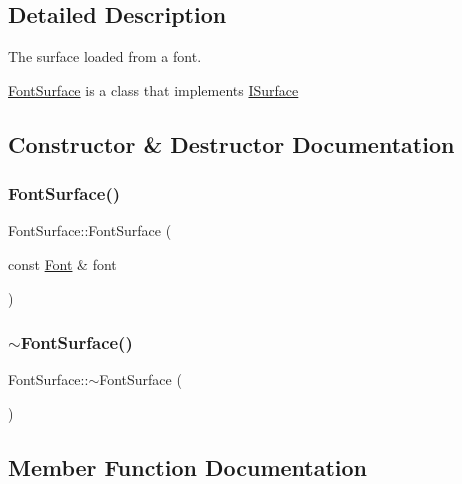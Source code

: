 \subsection{Detailed Description}
The surface loaded from a font. 

\mbox{\hyperlink{class_font_surface}{Font\+Surface}} is a class that implements \mbox{\hyperlink{class_i_surface}{I\+Surface}} 

\subsection{Constructor \& Destructor Documentation}
\mbox{\label{class_font_surface_af8e3c82416727b71fd13f8f49ffbb3ef}} 
\subsubsection{\texorpdfstring{Font\+Surface()}{FontSurface()}}
{\footnotesize\ttfamily Font\+Surface\+::\+Font\+Surface (\begin{DoxyParamCaption}\item[{const \mbox{\hyperlink{class_font}{Font}} \&}]{font }\end{DoxyParamCaption})}

\mbox{\label{class_font_surface_a0b009ae8b96cc763e70e31c2c76a0807}} 
\subsubsection{\texorpdfstring{$\sim$\+Font\+Surface()}{~FontSurface()}}
{\footnotesize\ttfamily Font\+Surface\+::$\sim$\+Font\+Surface (\begin{DoxyParamCaption}{ }\end{DoxyParamCaption})\hspace{0.3cm}{\ttfamily [virtual]}}



\subsection{Member Function Documentation}
\mbox{\label{class_font_surface_a611d81ba179c87aef331d8b5dbef2eb6}} 
